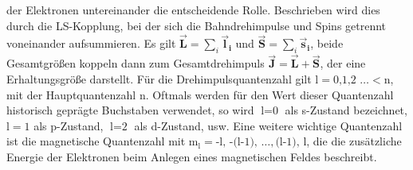 der Elektronen untereinander die entscheidende Rolle. Beschrieben wird dies
durch die LS-Kopplung, bei der sich die Bahndrehimpulse und Spins getrennt
voneinander aufsummieren. Es gilt $ \vec{\textbf{L}}=\sum_i
\vec{\textbf{l}}_{\textbf{i}}$ und $ \vec{\textbf{S}}=\sum_i
\vec{\textbf{s}}_{\textbf{i}}$, beide Gesamtgrößen koppeln dann zum
Gesamtdrehimpuls $ \vec{\textbf{J}}= \vec{\textbf{L}} +  \vec{\textbf{S}}$, der
eine Erhaltungsgröße darstellt. Für die Drehimpulsquantenzahl gilt
$\text{l}=\text{0,1,2 \ldots}<\text{n}$, mit der Hauptquantenzahl n. Oftmals
werden für den Wert dieser Quantenzahl historisch geprägte Buchstaben verwendet,
so wird $\text{l}=\text{0}$ als s-Zustand bezeichnet, $\text{l}=1$ als
p-Zustand, $\text{l}=\text{2}$ als d-Zustand, usw. Eine weitere wichtige
Quantenzahl ist die magnetische Quantenzahl mit $\text{m}_\text{l}=\text{-l, }
\text{-(l-1), }\ldots,\text{(l-1), }\text{l}$, die die zusätzliche Energie der
Elektronen beim Anlegen eines magnetischen Feldes beschreibt.
